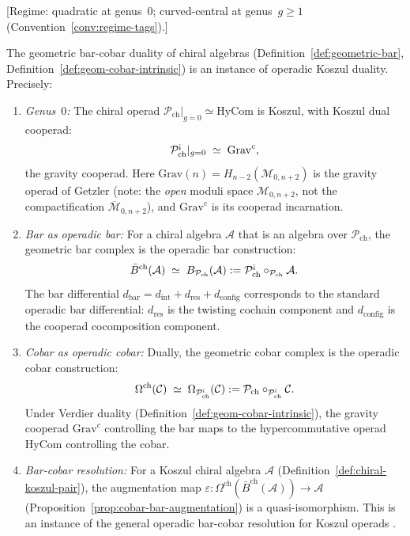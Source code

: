 \begin{theorem}\label{thm:prism-operadic}
\textup{[Regime: quadratic at genus~$0$; curved-central at genus~$g \geq 1$
\textup{(}Convention~\textup{\ref{conv:regime-tags})}.]}

The geometric bar-cobar duality of chiral algebras
(Definition~\ref{def:geometric-bar},
Definition~\ref{def:geom-cobar-intrinsic}) is an instance of operadic
Koszul duality.  Precisely:
\begin{enumerate}[label=\textup{(\roman*)}]
\item \emph{Genus~$0$:} The chiral operad
  $\mathcal{P}_{\mathrm{ch}}|_{g=0} \simeq \mathrm{HyCom}$ is Koszul,
  with Koszul dual cooperad:
  \[
  \mathcal{P}_{\mathrm{ch}}^{\text{\textexclamdown}}|_{g=0}
  \;\simeq\; \mathrm{Grav}^c,
  \]
  the gravity cooperad.  Here $\mathrm{Grav}(n) =
  H_{n-2}(\mathcal{M}_{0,n+2})$ is the gravity operad
  of Getzler \cite{Get95} (note: the \emph{open} moduli space
  $\mathcal{M}_{0,n+2}$, not the compactification $\overline{\mathcal{M}}_{0,n+2}$), and $\mathrm{Grav}^c$ is its cooperad
  incarnation.

\item \emph{Bar as operadic bar:} For a chiral algebra $\mathcal{A}$
  that is an algebra over $\mathcal{P}_{\mathrm{ch}}$, the geometric
  bar complex is the operadic bar construction:
  \[
  \bar{B}^{\mathrm{ch}}(\mathcal{A})
  \;\simeq\;
  B_{\mathcal{P}_{\mathrm{ch}}}(\mathcal{A})
  := \mathcal{P}_{\mathrm{ch}}^{\text{\textexclamdown}}
  \circ_{\mathcal{P}_{\mathrm{ch}}} \mathcal{A}.
  \]
  The bar differential $d_{\mathrm{bar}} = d_{\mathrm{int}} +
  d_{\mathrm{res}} + d_{\mathrm{config}}$ corresponds to the
  standard operadic bar differential: $d_{\mathrm{res}}$ is the
  twisting cochain component and $d_{\mathrm{config}}$ is the
  cooperad cocomposition component.

\item \emph{Cobar as operadic cobar:} Dually, the geometric cobar
  complex is the operadic cobar construction:
  \[
  \Omega^{\mathrm{ch}}(\mathcal{C})
  \;\simeq\;
  \Omega_{\mathcal{P}_{\mathrm{ch}}^{\text{\textexclamdown}}}(\mathcal{C})
  := \mathcal{P}_{\mathrm{ch}}
  \circ_{\mathcal{P}_{\mathrm{ch}}^{\text{\textexclamdown}}} \mathcal{C}.
  \]
  Under Verdier duality
  (Definition~\ref{def:geom-cobar-intrinsic}), the gravity cooperad
  $\mathrm{Grav}^c$ controlling the bar maps to the hypercommutative
  operad $\mathrm{HyCom}$ controlling the cobar.

\item \emph{Bar-cobar resolution:} For a Koszul chiral algebra
  $\mathcal{A}$ (Definition~\ref{def:chiral-koszul-pair}), the
  augmentation map
  $\varepsilon\colon
  \Omega^{\mathrm{ch}}(\bar{B}^{\mathrm{ch}}(\mathcal{A}))
  \to \mathcal{A}$
  (Proposition~\ref{prop:cobar-bar-augmentation})
  is a quasi-isomorphism.  This is an instance of the general operadic
  bar-cobar resolution for Koszul operads \cite[Theorem~11.3.3]{LV12}.
\end{enumerate}
\end{theorem}

